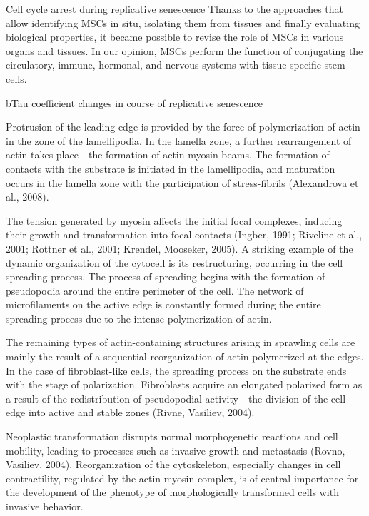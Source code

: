 \documentclass[alpha-refs]{wiley-article}
\begin{document}
Cell cycle arrest during replicative senescence
Thanks to the approaches that allow identifying MSCs in situ, isolating them from tissues and finally evaluating biological properties, it became possible to revise the role of MSCs in various organs and tissues.
In our opinion, MSCs perform the function of conjugating the circulatory, immune, hormonal, and nervous systems with tissue-specific stem cells.

bTau coefficient changes in course of replicative senescence

Protrusion of the leading edge is provided by the force of polymerization of actin in the zone of the lamellipodia. In the lamella zone, a further rearrangement of actin takes place - the formation of actin-myosin beams.
The formation of contacts with the substrate is initiated in the lamellipodia, and maturation occurs in the lamella zone with the participation of stress-fibrils (Alexandrova et al., 2008).


The tension generated by myosin affects the initial focal complexes, inducing their growth and transformation into focal contacts (Ingber, 1991; Riveline et al., 2001; Rottner et al., 2001; Krendel, Mooseker, 2005).
A striking example of the dynamic organization of the cytocell is its restructuring, occurring in the cell spreading process.
The process of spreading begins with the formation of pseudopodia around the entire perimeter of the cell.
The network of microfilaments on the active edge is constantly formed during the entire spreading process due to the intense polymerization of actin.

The remaining types of actin-containing structures arising in sprawling cells are mainly the result of a sequential reorganization of actin polymerized at the edges.
In the case of fibroblast-like cells, the spreading process on the substrate ends with the stage of polarization. Fibroblasts acquire an elongated polarized form as a result of the redistribution of pseudopodial activity - the division of the cell edge into active and stable zones (Rivne, Vasiliev, 2004).

Neoplastic transformation disrupts normal morphogenetic reactions and cell mobility, leading to processes such as invasive growth and metastasis (Rovno, Vasiliev, 2004).
Reorganization of the cytoskeleton, especially changes in cell contractility, regulated by the actin-myosin complex, is of central importance for the development of the phenotype of morphologically transformed cells with invasive behavior.
\end{document}
